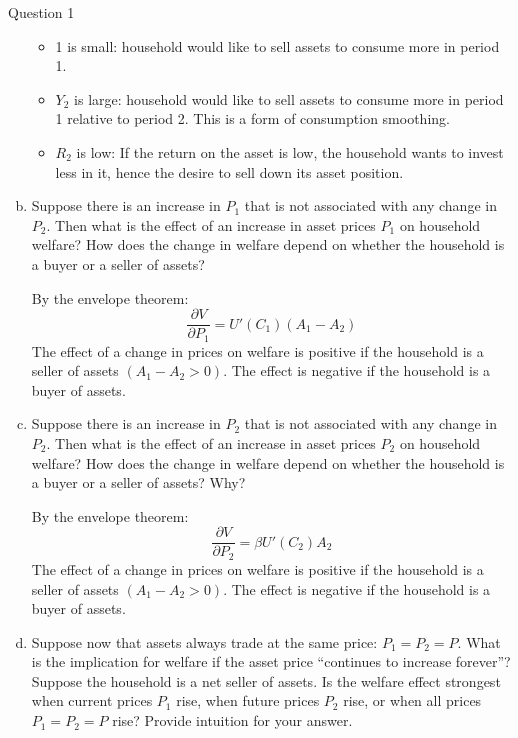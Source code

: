 \documentclass[a4paper]{article}
\begin{document}
\begin{questionbox}{Question 1}
\begin{enumerate}[(a)]
\begin{explanationbox}
				\begin{itemize}
					\item 1 is small: household would like to sell assets to consume more in period 1. 
					\item \( Y_2 \) is large: household would like to sell assets to consume more in period 1 relative to period 2. This is a form of consumption smoothing.
					\item \( R_2 \) is low: If the return on the asset is low, the household wants to invest less in it, hence the desire to sell down its asset position.
				\end{itemize}
			\end{explanationbox}
			\item Suppose there is an increase in \( P_1 \) that is not associated with any change in \( P_2 \). Then what is the eﬀect of an increase in asset prices \( P_1 \) on household welfare? How does the change in welfare depend on whether the household is a buyer or a seller of assets?
			\begin{explanationbox}
				By the envelope theorem:
				\[
					\frac{\partial V}{\partial P_1} = U'(C_1)(A_1 - A_2)
				\]
				The effect of a change in prices on welfare is positive if the household is a seller of assets \( (A_1 - A_2 > 0) \). The eﬀect is negative if the household is a buyer of assets.
			\end{explanationbox}
			\item Suppose there is an increase in \( P_2 \) that is not associated with any change in \( P_2 \). Then what is the eﬀect of an increase in asset prices \( P_2 \) on household welfare? How does the change in welfare depend on whether the household is a buyer or a seller of assets? Why?
			\begin{explanationbox}
				By the envelope theorem:
				\[
					\frac{\partial V}{\partial P_2} = \beta U'(C_2)A_2
				\]
				The eﬀect of a change in prices on welfare is positive if the household is a seller of assets \( (A_1 - A_2 > 0) \). The eﬀect is negative if the household is a buyer of assets.
			\end{explanationbox}
			\item Suppose now that assets always trade at the same price: \( P_1 = P_2 = P \). What is the implication for welfare if the asset price ``continues to increase forever''? Suppose the household is a net seller of assets. Is the welfare eﬀect strongest when current prices \( P_1 \) rise, when future prices \( P_2 \) rise, or when all prices \( P_1 = P_2 = P \) rise? Provide intuition for your answer.

\end{enumerate}
\end{questionbox}
\end{document}
